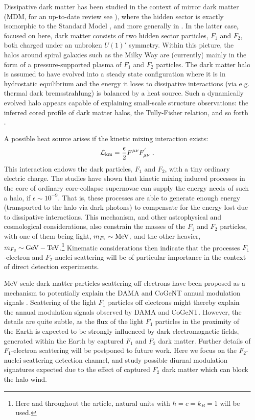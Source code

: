 \documentclass[12pt]{article}
\begin{document}
Dissipative dark matter has been studied in the context of mirror dark matter \cite{volkasspheroidal} (MDM, for an up-to-date review see \cite{review}), where the hidden sector is exactly isomorphic to the Standard Model \cite{footlewvolkas}, and more generally in \cite{dhsdm}. In the latter case, focused on here, dark matter consists of two hidden sector particles, $F_1$ and $F_2$, both charged under an unbroken $U(1)'$ symmetry. Within this picture, the halos around spiral galaxies such as the Milky Way are (currently) mainly in the form of a pressure-supported plasma of $F_1$ and $F_2$ particles. The dark matter halo is assumed to have evolved into a steady state configuration where it is in hydrostatic equilibrium and the energy it loses to dissipative interactions (via e.g. thermal dark bremsstrahlung) is balanced by a heat source. Such a dynamically evolved halo appears capable of explaining small-scale structure observations: the inferred cored profile of dark matter halos, the Tully-Fisher relation, and so forth \cite{dhsdm}.

A possible heat source arises if the kinetic mixing interaction exists:
%
\begin{eqnarray}
{\cal L} _{\text{km}} = \frac{\epsilon}{2}F ^{\mu \nu}F ^{'} _{\mu \nu} \ .
\end{eqnarray}
%
This interaction endows the dark particles, $F_1$ and $F_2$, with a tiny ordinary electric charge. The studies \cite{review,dhsdm} have shown that kinetic mixing induced processes in the core of ordinary core-collapse supernovae can supply the energy needs of such a halo, if $\epsilon \sim 10 ^{-9}$. That is, these processes are able to generate enough energy (transported to the halo via dark photons) to compensate for the energy lost due to dissipative interactions. This mechanism, and other astrophysical and cosmological considerations, also constrain the masses of the $F_1$ and $F_2$ particles, with one of them being light, $m _{F_1} \sim \rm MeV$, and the other heavier, $m _{F_2} \sim \rm GeV-TeV$.\footnote{Here and throughout the article, natural units with $\hbar = c = k _B = 1$ will be used.} Kinematic considerations then indicate that the processes $F_1$-electron and $F_2$-nuclei scattering will be of particular importance in the context of direct detection experiments.

MeV scale dark matter particles scattering off electrons have been proposed as a mechanism to potentially explain the DAMA \cite{dama} and CoGeNT \cite{cogent} annual modulation signals \cite{electron}. Scattering of the light $F_1$ particles off electrons might thereby explain the annual modulation signals observed by DAMA and CoGeNT. However, the details are quite subtle, as the flux of the light $F_1$ particles in the proximity of the Earth is expected to be strongly influenced by dark electromagnetic fields, generated within the Earth by captured $F_1$ and $F_2$ dark matter. Further details of $F_1$-electron scattering will be postponed to future work. Here we focus on the $F_2$-nuclei scattering detection channel, and study possible diurnal modulation signatures expected due to the effect of captured $F_2$ dark matter which can block the halo wind.
 
\end{document}
